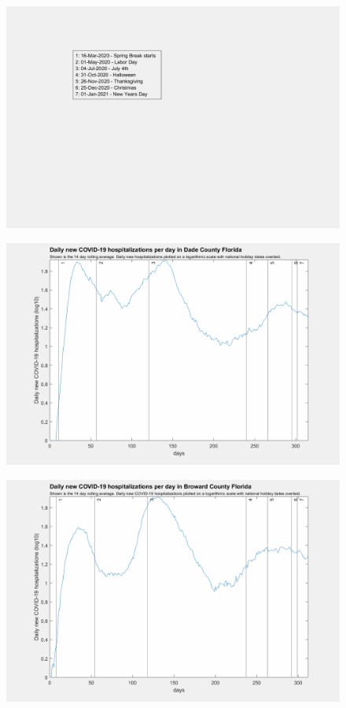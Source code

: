 \documentclass[]{article}
\begin{document}
\begin{figure}[!h]
	\includegraphics[width=\linewidth]{legends/holiday_legend.png}
	\caption{}
	\label{fig:legends/holiday_legendLabel}
\end{figure}

\begin{figure}[!h]
	\includegraphics[width=\linewidth]{images/dade_hospitalizations_holiday_log.png}
	\caption{}
	\label{fig:images/dade_hospitalizations_holiday_logLabel}
\end{figure}

\begin{figure}[!h]
	\includegraphics[width=\linewidth]{images/broward_hospitalizations_holiday_log.png}
	\caption{}
	\label{fig:images/broward_hospitalizations_holiday_logLabel}
\end{figure}
\end{document}
